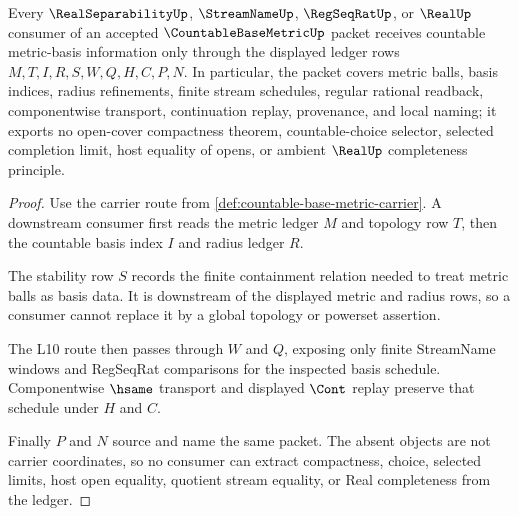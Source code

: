 \begin{theorem}
\label{thm:countable-base-metric-ledger-coverage}
Every $\RealSeparabilityUp$, $\StreamNameUp$, $\RegSeqRatUp$, or $\RealUp$ consumer of an accepted $\CountableBaseMetricUp$ packet receives countable metric-basis information only through the displayed ledger rows $M,T,I,R,S,W,Q,H,C,P,N$. In particular, the packet covers metric balls, basis indices, radius refinements, finite stream schedules, regular rational readback, componentwise transport, continuation replay, provenance, and local naming; it exports no open-cover compactness theorem, countable-choice selector, selected completion limit, host equality of opens, or ambient $\RealUp$ completeness principle.
\end{theorem}
\begin{proof}
Use the carrier route from \autoref{def:countable-base-metric-carrier}. A downstream consumer first reads the metric ledger $M$ and topology row $T$, then the countable basis index $I$ and radius ledger $R$.

The stability row $S$ records the finite containment relation needed to treat metric balls as basis data. It is downstream of the displayed metric and radius rows, so a consumer cannot replace it by a global topology or powerset assertion.

The L10 route then passes through $W$ and $Q$, exposing only finite StreamName windows and RegSeqRat comparisons for the inspected basis schedule. Componentwise $\hsame$ transport and displayed $\Cont$ replay preserve that schedule under $H$ and $C$.

Finally $P$ and $N$ source and name the same packet. The absent objects are not carrier coordinates, so no consumer can extract compactness, choice, selected limits, host open equality, quotient stream equality, or Real completeness from the ledger.
\end{proof}



